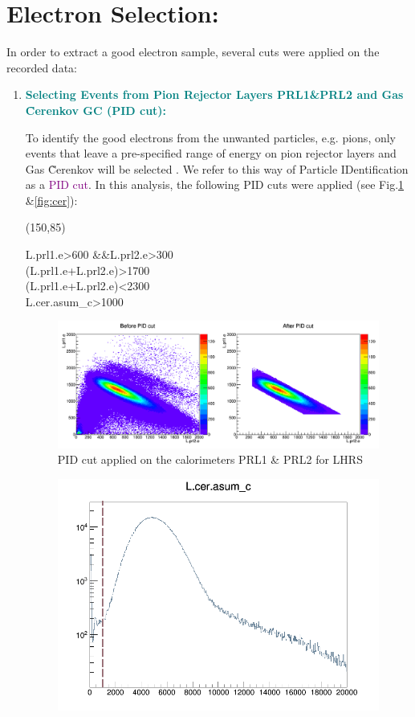 \documentclass[11pt]{article}
\begin{document}
\begin{enumerate}
{}
\end{enumerate}
\section{Electron Selection:}
  In order to extract a good electron sample, several cuts were applied on the recorded data:
   \begin{enumerate}  
   \item{\textcolor{teal}{\textbf{Selecting Events from Pion Rejector Layers PRL1\&PRL2 and Gas \~Cerenkov GC (PID cut):}}}\par
   To identify the good electrons from the unwanted particles, e.g. pions, only events that leave a pre-specified range of energy on pion rejector layers and Gas \~Cerenkov will be selected .  We refer to this way of Particle IDentification as a \textcolor{purple}{PID cut}. In this analysis, the following PID cuts were applied (see Fig.\ref{fig:prl} \&\ref{fig:cer}):\par
\begin{center}
\framebox(150,85){%
    \parbox{140\unitlength}{L.prl1.e>600 \&\&L.prl2.e>300 \\(L.prl1.e+L.prl2.e)>1700 \\(L.prl1.e+L.prl2.e)<2300 \\L.cer.asum\_c>1000}%
}
\end{center}
\begin{figure}[H]
 \includegraphics[width=\linewidth]{prl_0.png}
  \caption{PID cut applied on the calorimeters PRL1 \& PRL2 for LHRS}
  \label{fig:prl}
\end{figure}
\begin{figure}[H]
\centering
 \includegraphics[width=0.6\linewidth]{cer.png}

\end{figure}
\end{enumerate}
\end{document}
